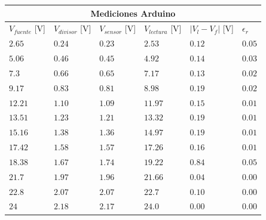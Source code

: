 \documentclass[12pt,a4paper]{article}
\begin{document}
			\begin{center}
			{\footnotesize \begin{tabular}{ |l|l|l|l|l|l| }

			\hline
				\multicolumn{6}{|c|}{\textbf{Mediciones Arduino}}\\ \hline
				$V_{fuente}$ [V]& $V_{divisor}$ [V]& $V_{sensor}$ [V]& $ V_{lectura}$ [V]& $| V_l - V_f |$ [V]& $\epsilon _r$\\ \hline
				$ 2.65  $ & $0.24$ & $0.23$ & $2.53  $ & $ 0.12  $  & $  0.05 $\\ \hline                                                                 
				$ 5.06  $ & $0.46$ & $0.45$ & $4.92  $ & $ 0.14  $  & $  0.03 $\\ \hline                                                                 
				$ 7.3   $ & $0.66$ & $0.65$ & $7.17  $ & $ 0.13  $  & $  0.02 $\\ \hline                                                                
				$ 9.17  $ & $0.83$ & $0.81$ & $8.98  $ & $ 0.19  $  & $  0.02 $\\ \hline                                                                 
				$ 12.21 $ & $1.10$ & $1.09$ & $11.97 $ & $ 0.15  $  & $  0.01 $\\ \hline                                                                   
				$ 13.51 $ & $1.23$ & $1.21$ & $13.32 $ & $ 0.19  $  & $  0.01 $\\ \hline                                                                  
				$ 15.16 $ & $1.38$ & $1.36$ & $14.97 $ & $ 0.19  $  & $  0.01 $\\ \hline                                                                  
				$ 17.42 $ & $1.58$ & $1.57$ & $17.26 $ & $ 0.16  $  & $  0.01 $\\ \hline                                                                  
				$ 18.38 $ & $1.67$ & $1.74$ & $19.22 $ & $ 0.84  $  & $  0.05 $\\ \hline                                                                  
				$ 21.7  $ & $1.97$ & $1.96$ & $21.66 $ & $ 0.04  $  & $  0.00 $\\ \hline                                                                   
				$ 22.8  $ & $2.07$ & $2.07$ & $22.7  $ & $ 0.10  $  & $  0.00 $\\ \hline                                                                 
				$ 24    $ & $2.18$ & $2.17$ & $24.0  $ & $ 0.00  $  & $  0.00 $\\ \hline                                                                 

\end{tabular}}
\end{center}
\end{document}
